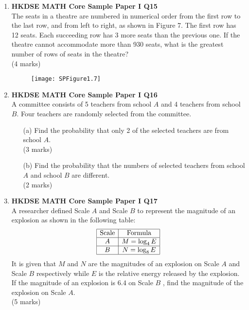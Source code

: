 \documentclass[12pt]{article}
\begin{document}
\begin{enumerate}
	\item \textbf{HKDSE MATH Core Sample Paper I Q15}\\
	The seats in a theatre are numbered in numerical order from the first row to the last row, and from left to right, as shown in Figure 7. The first row has 12 seats. Each succeeding row has 3 more seats than the previous one. If the theatre cannot accommodate more than 930 seats, what is the greatest number of rows of seats in the theatre? \\(4 marks)
	\begin{figure}[H]
		\centering
		\texttt{[image: SPFigure1.7]}
	\end{figure}

	\item \textbf{HKDSE MATH Core Sample Paper I Q16}\\
	A committee consists of 5 teachers from school $A$ and 4 teachers from school $B$. Four teachers are randomly selected from the committee.
	\begin{enumerate}
		\item[(a)] Find the probability that only 2 of the selected teachers are from school $A$. \\(3 marks)
		\item[(b)] Find the probability that the numbers of selected teachers from school $A$ and school $B$ are
		different. \\(2 marks)
	\end{enumerate}

	\item \textbf{HKDSE MATH Core Sample Paper I Q17}\\
	A researcher defined Scale $A$ and Scale $B$ to represent the magnitude of an explosion as shown in the following table:
	$$\begin{array}{|c|c|}
		\hline
		\text{Scale} & \text{Formula} \\
		\hline
		A & M = \log_4{E} \\
		\hline		
		B & N = \log_8{E} \\
		\hline
	\end{array}$$
	It is given that $M$ and $N$ are the magnitudes of an explosion on Scale $A$ and Scale $B$ respectively while $E$ is the relative energy released by the explosion. If the magnitude of an explosion is 6.4 on Scale $B$ , find the magnitude of the explosion on Scale $A$. \\(5 marks)


\end{enumerate}
\end{document}
